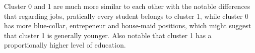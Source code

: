 \documentclass{article}
\begin{document}
\begin{enumerate}[leftmargin=\labelsep]
\begin{enumerate}
Cluster 0 and 1 are much more similar to each other with the notable
differences that regarding jobs, pratically every student belongs to cluster 1,
while cluster 0 has more blue-collar, entrepeneur and house-maid positions,
which might suggest that cluster 1 is generally younger. Also notable that cluster
1 has a proportionally higher level of education.

\end{enumerate}
\end{enumerate}

\newpage

\end{document}

